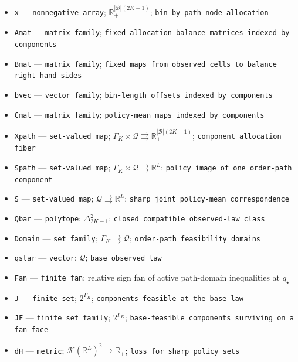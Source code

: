 \documentclass{article}
\begin{document}
\begin{itemize}
  \item \texttt{x} --- \texttt{nonnegative array}; \(\mathbb R_+^{|\mathcal B|(2K-1)}\); \texttt{bin-\allowbreak{}by-\allowbreak{}path-\allowbreak{}node allocation}
  \item \texttt{Amat} --- \texttt{matrix family}; \texttt{fixed allocation-\allowbreak{}balance matrices indexed by components}
  \item \texttt{Bmat} --- \texttt{matrix family}; \texttt{fixed maps from observed cells to balance right-\allowbreak{}hand sides}
  \item \texttt{bvec} --- \texttt{vector family}; \texttt{bin-\allowbreak{}length offsets indexed by components}
  \item \texttt{Cmat} --- \texttt{matrix family}; \texttt{policy-\allowbreak{}mean maps indexed by components}
  \item \texttt{Xpath} --- \texttt{set-\allowbreak{}valued map}; \(\Gamma_K\times\mathcal Q\rightrightarrows\mathbb R_+^{|\mathcal B|(2K-1)}\); \texttt{component allocation fiber}
  \item \texttt{Spath} --- \texttt{set-\allowbreak{}valued map}; \(\Gamma_K\times\mathcal Q\rightrightarrows\mathbb R^L\); \texttt{policy image of one order-\allowbreak{}path component}
  \item \texttt{S} --- \texttt{set-\allowbreak{}valued map}; \(\mathcal Q\rightrightarrows\mathbb R^L\); \texttt{sharp joint policy-\allowbreak{}mean correspondence}
  \item \texttt{Qbar} --- \texttt{polytope}; \(\Delta_{2K-1}^2\); \texttt{closed compatible observed-\allowbreak{}law class}
  \item \texttt{Domain} --- \texttt{set family}; \(\Gamma_K\rightrightarrows\overline{\mathcal Q}\); \texttt{order-\allowbreak{}path feasibility domains}
  \item \texttt{qstar} --- \texttt{vector}; \(\overline{\mathcal Q}\); \texttt{base observed law}
  \item \texttt{Fan} --- \texttt{finite fan}; relative sign fan of active path-domain inequalities at \(q_\star\)
  \item \texttt{J} --- \texttt{finite set}; \(2^{\Gamma_K}\); \texttt{components feasible at the base law}
  \item \texttt{JF} --- \texttt{finite set family}; \(2^{\Gamma_K}\); \texttt{base-\allowbreak{}feasible components surviving on a fan face}
  \item \texttt{dH} --- \texttt{metric}; \(\mathcal K(\mathbb R^L)^2\to\mathbb R_+\); \texttt{loss for sharp policy sets}

\end{itemize}
\end{document}
